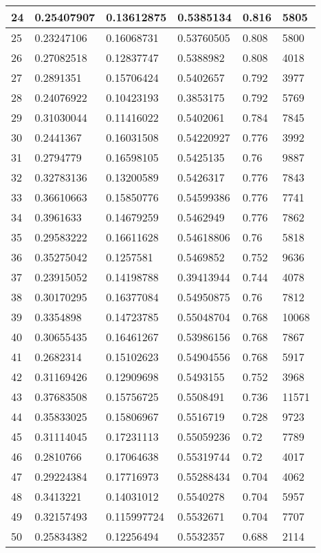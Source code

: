 \begin{longtable}{|l|l|l|l|l|l|}
24 & 0.25407907 & 0.13612875 & 0.5385134 & 0.816 & 5805 \\ \hline 
25 & 0.23247106 & 0.16068731 & 0.53760505 & 0.808 & 5800 \\ \hline 
26 & 0.27082518 & 0.12837747 & 0.5388982 & 0.808 & 4018 \\ \hline 
27 & 0.2891351 & 0.15706424 & 0.5402657 & 0.792 & 3977 \\ \hline 
28 & 0.24076922 & 0.10423193 & 0.3853175 & 0.792 & 5769 \\ \hline 
29 & 0.31030044 & 0.11416022 & 0.5402061 & 0.784 & 7845 \\ \hline 
30 & 0.2441367 & 0.16031508 & 0.54220927 & 0.776 & 3992 \\ \hline 
31 & 0.2794779 & 0.16598105 & 0.5425135 & 0.76 & 9887 \\ \hline 
32 & 0.32783136 & 0.13200589 & 0.5426317 & 0.776 & 7843 \\ \hline 
33 & 0.36610663 & 0.15850776 & 0.54599386 & 0.776 & 7741 \\ \hline 
34 & 0.3961633 & 0.14679259 & 0.5462949 & 0.776 & 7862 \\ \hline 
35 & 0.29583222 & 0.16611628 & 0.54618806 & 0.76 & 5818 \\ \hline 
36 & 0.35275042 & 0.1257581 & 0.5469852 & 0.752 & 9636 \\ \hline 
37 & 0.23915052 & 0.14198788 & 0.39413944 & 0.744 & 4078 \\ \hline 
38 & 0.30170295 & 0.16377084 & 0.54950875 & 0.76 & 7812 \\ \hline 
39 & 0.3354898 & 0.14723785 & 0.55048704 & 0.768 & 10068 \\ \hline 
40 & 0.30655435 & 0.16461267 & 0.53986156 & 0.768 & 7867 \\ \hline 
41 & 0.2682314 & 0.15102623 & 0.54904556 & 0.768 & 5917 \\ \hline 
42 & 0.31169426 & 0.12909698 & 0.5493155 & 0.752 & 3968 \\ \hline 
43 & 0.37683508 & 0.15756725 & 0.5508491 & 0.736 & 11571 \\ \hline 
44 & 0.35833025 & 0.15806967 & 0.5516719 & 0.728 & 9723 \\ \hline 
45 & 0.31114045 & 0.17231113 & 0.55059236 & 0.72 & 7789 \\ \hline 
46 & 0.2810766 & 0.17064638 & 0.55319744 & 0.72 & 4017 \\ \hline 
47 & 0.29224384 & 0.17716973 & 0.55288434 & 0.704 & 4062 \\ \hline 
48 & 0.3413221 & 0.14031012 & 0.5540278 & 0.704 & 5957 \\ \hline 
49 & 0.32157493 & 0.115997724 & 0.5532671 & 0.704 & 7707 \\ \hline 
50 & 0.25834382 & 0.12256494 & 0.5532357 & 0.688 & 2114 \\ \hline 
\end{longtable}